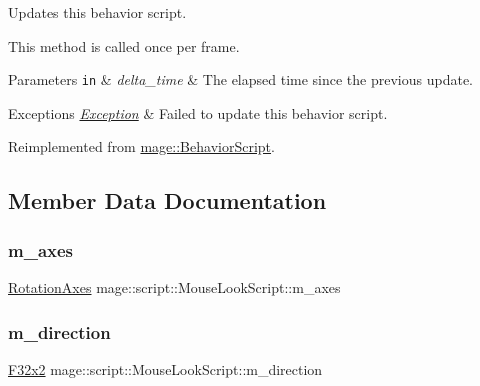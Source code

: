 Updates this behavior script.

This method is called once per frame.


\begin{DoxyParams}[1]{Parameters}
\mbox{\tt in}  & {\em delta\+\_\+time} & The elapsed time since the previous update. \\
\hline
\end{DoxyParams}

\begin{DoxyExceptions}{Exceptions}
{\em \hyperlink{classmage_1_1_exception}{Exception}} & Failed to update this behavior script. \\
\hline
\end{DoxyExceptions}


Reimplemented from \hyperlink{classmage_1_1_behavior_script_afb9cf3759edf8876416d1df85489cba6}{mage\+::\+Behavior\+Script}.



\subsection{Member Data Documentation}
\hypertarget{classmage_1_1script_1_1_mouse_look_script_ae41f05d545c70cd621a405f6ef0cd4d5}{}\label{classmage_1_1script_1_1_mouse_look_script_ae41f05d545c70cd621a405f6ef0cd4d5} 
\subsubsection{\texorpdfstring{m\+\_\+axes}{m\_axes}}
{\footnotesize\ttfamily \hyperlink{classmage_1_1script_1_1_mouse_look_script_aa8c8ce1a3e6ccefa7b8ddd31be209c23}{Rotation\+Axes} mage\+::script\+::\+Mouse\+Look\+Script\+::m\+\_\+axes\hspace{0.3cm}{\ttfamily [private]}}

\hypertarget{classmage_1_1script_1_1_mouse_look_script_a5f65024afe8940ca2709d5ee13dc033c}{}\label{classmage_1_1script_1_1_mouse_look_script_a5f65024afe8940ca2709d5ee13dc033c} 
\subsubsection{\texorpdfstring{m\+\_\+direction}{m\_direction}}
{\footnotesize\ttfamily \hyperlink{namespacemage_aa87237ad091f5cd7da612b8523fc108f}{F32x2} mage\+::script\+::\+Mouse\+Look\+Script\+::m\+\_\+direction\hspace{0.3cm}{\ttfamily [private]}}

